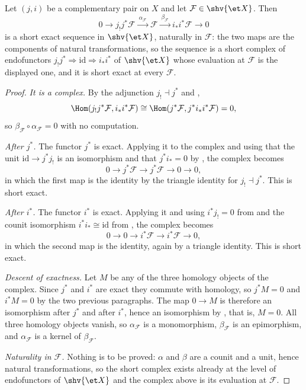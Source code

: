 \begin{theorem}
\label{thm:openclosed-exact}
\leanok
Let $(j,i)$ be a complementary pair on $X$ and let
$\mathcal F\in\shv{\et X}$.  Then
\[
  0\longrightarrow j_!j^*\mathcal F
   \xrightarrow{\ \alpha_{\mathcal F}\ }\mathcal F
   \xrightarrow{\ \beta_{\mathcal F}\ }i_*i^*\mathcal F\longrightarrow0
\]
is a short exact sequence in $\shv{\et X}$, naturally in $\mathcal F$: the
two maps are the components of natural transformations, so the sequence is a
short complex of endofunctors $j_!j^*\Rightarrow\mathrm{id}\Rightarrow i_*i^*$
of $\shv{\et X}$ whose evaluation at $\mathcal F$ is the displayed one, and it
is short exact at every $\mathcal F$.
\end{theorem}
\begin{proof}
\leanok
\emph{It is a complex.}  By the adjunction $j_!\dashv j^*$ and
,
\[
  \Hom(j_!j^*\mathcal F,i_*i^*\mathcal F)
  \cong\Hom(j^*\mathcal F,j^*i_*i^*\mathcal F)=0,
\]
so $\beta_{\mathcal F}\circ\alpha_{\mathcal F}=0$ with no computation.

\emph{After $j^*$.}  The functor $j^*$ is exact.  Applying it to the complex
and using that the unit $\mathrm{id}\to j^*j_!$ is an isomorphism and that
$j^*i_*=0$ by , the complex becomes
\[
  0\to j^*\mathcal F\to j^*\mathcal F\to0\to0,
\]
in which the first map is the identity by the triangle identity for
$j_!\dashv j^*$.  This is short exact.

\emph{After $i^*$.}  The functor $i^*$ is exact.  Applying it and using
$i^*j_!=0$ from  and the counit
isomorphism $i^*i_*\cong\mathrm{id}$ from
, the complex becomes
\[
  0\to0\to i^*\mathcal F\to i^*\mathcal F\to0,
\]
in which the second map is the identity, again by a triangle identity.  This
is short exact.

\emph{Descent of exactness.}  Let $M$ be any of the three homology objects of
the complex.  Since $j^*$ and $i^*$ are exact they commute with homology, so
$j^*M=0$ and $i^*M=0$ by the two previous paragraphs.  The map $0\to M$ is
therefore an isomorphism after $j^*$ and after $i^*$, hence an isomorphism by
, that is, $M=0$.  All three homology
objects vanish, so $\alpha_{\mathcal F}$ is a monomorphism,
$\beta_{\mathcal F}$ is an epimorphism, and $\alpha_{\mathcal F}$ is a kernel
of $\beta_{\mathcal F}$.

\emph{Naturality in $\mathcal F$.}  Nothing is to be proved: $\alpha$ and
$\beta$ are a counit and a unit, hence natural transformations, so the short
complex exists already at the level of endofunctors of $\shv{\et X}$ and the
complex above is its evaluation at $\mathcal F$.
\end{proof}

